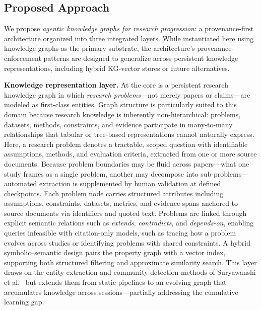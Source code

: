 \subsection{Proposed Approach}
\label{sec:proposal-approach}

We propose \emph{agentic knowledge graphs for research progression}: a provenance-first architecture organized into three integrated layers. While instantiated here using knowledge graphs as the primary substrate, the architecture's provenance-enforcement patterns are designed to generalize across persistent knowledge representations, including hybrid KG-vector stores or future alternatives.

\textbf{Knowledge representation layer.} At the core is a persistent research knowledge graph in which \emph{research problems}---not merely papers or claims---are modeled as first-class entities. Graph structure is particularly suited to this domain because research knowledge is inherently non-hierarchical: problems, datasets, methods, constraints, and evidence participate in many-to-many relationships that tabular or tree-based representations cannot naturally express. Here, a research problem denotes a tractable, scoped question with identifiable assumptions, methods, and evaluation criteria, extracted from one or more source documents. Because problem boundaries may be fluid across papers---what one study frames as a single problem, another may decompose into sub-problems---automated extraction is supplemented by human validation at defined checkpoints. Each problem node carries structured attributes including assumptions, constraints, datasets, metrics, and evidence spans anchored to source documents via identifiers and quoted text. Problems are linked through explicit semantic relations such as \emph{extends}, \emph{contradicts}, and \emph{depends-on}, enabling queries infeasible with citation-only models, such as tracing how a problem evolves across studies or identifying problems with shared constraints. A hybrid symbolic--semantic design pairs the property graph with a vector index, supporting both structured filtering and approximate similarity search. This layer draws on the entity extraction and community detection methods of Suryawanshi et al.~\cite{suryawanshi2025kgrag} but extends them from static pipelines to an evolving graph that accumulates knowledge across sessions---partially addressing the cumulative learning gap.

